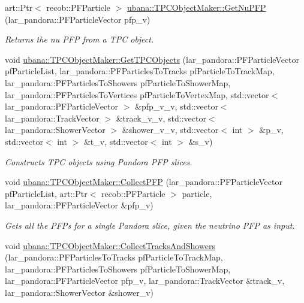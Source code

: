 \begin{DoxyCompactItemize}
\item 
art\-::\-Ptr$<$ recob\-::\-P\-F\-Particle $>$ \hyperlink{group__UBXSec_gaf2a3603228fdfebf073653770c7ebb84}{ubana\-::\-T\-P\-C\-Object\-Maker\-::\-Get\-Nu\-P\-F\-P} (lar\-\_\-pandora\-::\-P\-F\-Particle\-Vector pfp\-\_\-v)
\begin{DoxyCompactList}\small\item\em Returns the nu P\-F\-P from a T\-P\-C object. \end{DoxyCompactList}\item 
void \hyperlink{group__UBXSec_ga4265f9226b84aa982bdb5039bdd7738a}{ubana\-::\-T\-P\-C\-Object\-Maker\-::\-Get\-T\-P\-C\-Objects} (lar\-\_\-pandora\-::\-P\-F\-Particle\-Vector pf\-Particle\-List, lar\-\_\-pandora\-::\-P\-F\-Particles\-To\-Tracks pf\-Particle\-To\-Track\-Map, lar\-\_\-pandora\-::\-P\-F\-Particles\-To\-Showers pf\-Particle\-To\-Shower\-Map, lar\-\_\-pandora\-::\-P\-F\-Particles\-To\-Vertices pf\-Particle\-To\-Vertex\-Map, std\-::vector$<$ lar\-\_\-pandora\-::\-P\-F\-Particle\-Vector $>$ \&pfp\-\_\-v\-\_\-v, std\-::vector$<$ lar\-\_\-pandora\-::\-Track\-Vector $>$ \&track\-\_\-v\-\_\-v, std\-::vector$<$ lar\-\_\-pandora\-::\-Shower\-Vector $>$ \&shower\-\_\-v\-\_\-v, std\-::vector$<$ int $>$ \&p\-\_\-v, std\-::vector$<$ int $>$ \&t\-\_\-v, std\-::vector$<$ int $>$ \&s\-\_\-v)
\begin{DoxyCompactList}\small\item\em Constructs T\-P\-C objects using Pandora P\-F\-P slices. \end{DoxyCompactList}\item 
void \hyperlink{group__UBXSec_gab55f5535163da51b4aeef1805041876b}{ubana\-::\-T\-P\-C\-Object\-Maker\-::\-Collect\-P\-F\-P} (lar\-\_\-pandora\-::\-P\-F\-Particle\-Vector pf\-Particle\-List, art\-::\-Ptr$<$ recob\-::\-P\-F\-Particle $>$ particle, lar\-\_\-pandora\-::\-P\-F\-Particle\-Vector \&pfp\-\_\-v)
\begin{DoxyCompactList}\small\item\em Gets all the P\-F\-Ps for a single Pandora slice, given the neutrino P\-F\-P as input. \end{DoxyCompactList}\item 
void \hyperlink{group__UBXSec_ga3634deb340ab0cc3c9f00b34386bfa72}{ubana\-::\-T\-P\-C\-Object\-Maker\-::\-Collect\-Tracks\-And\-Showers} (lar\-\_\-pandora\-::\-P\-F\-Particles\-To\-Tracks pf\-Particle\-To\-Track\-Map, lar\-\_\-pandora\-::\-P\-F\-Particles\-To\-Showers pf\-Particle\-To\-Shower\-Map, lar\-\_\-pandora\-::\-P\-F\-Particle\-Vector pfp\-\_\-v, lar\-\_\-pandora\-::\-Track\-Vector \&track\-\_\-v, lar\-\_\-pandora\-::\-Shower\-Vector \&shower\-\_\-v)

\end{DoxyCompactItemize}
